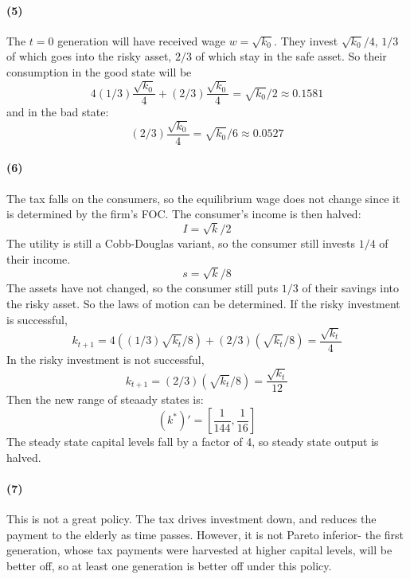 \documentclass[10pt,letter]{article}
\newcommand{\problem}[1]{\section*{Problem #1}}
\newcommand{\problempart}[1]{\paragraph{#1}}
\begin{document}
\problempart{(5)}
The $t=0$ generation will have received wage $w = \sqrt{k_0}$. They invest $\sqrt{k_0}/4$, $1/3$ of which goes into the risky asset, $2/3$ of which stay in the safe asset. So their consumption in the good state will be
\[ 4(1/3)\frac{\sqrt{k_0}}{4} + (2/3)\frac{\sqrt{k_0}}{4} = \sqrt{k_0}/2 \approx 0.1581 \]
and in the bad state:
\[ (2/3)\frac{\sqrt{k_0}}{4} = \sqrt{k_0}/6 \approx 0.0527 \]
\problempart{(6)}
The tax falls on the consumers, so the equilibrium wage does not change since it is determined by the firm's FOC. The consumer's income is then halved:
\[ I = \sqrt{k}/2 \]
The utility is still a Cobb-Douglas variant, so the consumer still invests $1/4$ of their income.
\[ s = \sqrt{k}/8 \]
The assets have not changed, so the consumer still puts $1/3$ of their savings into the risky asset. So the laws of motion can be determined.
If the risky investment is successful, \[ k_{t+1} = 4((1/3)\sqrt{k_t}/8) + (2/3) (\sqrt{k_t}/8) = \frac{\sqrt{k_t}}{4}  \]
In the risky investment is not successful, \[ k_{t+1} = (2/3) (\sqrt{k_t}/8) = \frac{\sqrt{k_t}}{12}  \]
Then the new range of steaady states is:
\[ (k^*)' = \left[\frac{1}{144}, \frac{1}{16} \right] \]
The steady state capital levels fall by a factor of 4, so steady state output is halved.
\problempart{(7)}
This is not a great policy. The tax drives investment down, and reduces the payment to the elderly as time passes. However, it is not Pareto inferior- the first generation, whose tax payments were harvested at higher capital levels, will be better off, so at least one generation is better off under this policy.
%
\end{document}
